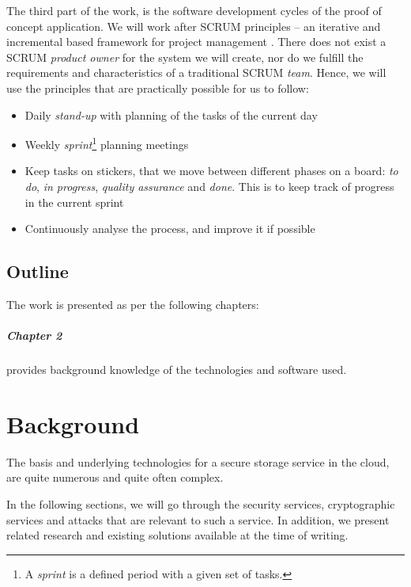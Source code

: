 \documentclass[pdftex,english,10pt,b5paper,twoside]{book}
\begin{document}
The third part of the work, is the software development cycles of the proof of
concept application. We will work after SCRUM principles -- an iterative and
incremental based framework for project management \cite{scrum}. There does not
exist a SCRUM \emph{product owner} for the system we will create, nor do we
fulfill the requirements and characteristics \cite{scrum} of a traditional
SCRUM \emph{team}. Hence, we will use the principles that are practically
possible for us to follow:

\begin{itemize}
  \item Daily \emph{stand-up} with planning of the tasks of the current day
  \item Weekly \emph{sprint}\footnote{A \emph{sprint} is a defined period with
    a given set of tasks.} planning meetings 
  \item Keep tasks on stickers, that we move between different phases on a
    board: \emph{to do}, \emph{in progress}, \emph{quality assurance} and
    \emph{done}. This is to keep track of progress in the current sprint
  \item Continuously analyse the process, and improve it if possible
\end{itemize}

\section{Outline}

The work is presented as per the following chapters:

\paragraph{Chapter 2} provides background knowledge of the technologies and
software used.


\chapter{Background}

The basis and underlying technologies for a secure storage service in the
cloud, are quite numerous and quite often complex.

In the following sections, we will go through the security services, cryptographic
services and attacks that are relevant to such a service. In addition, we present
related research and existing solutions available at the time of writing.
\end{document}
